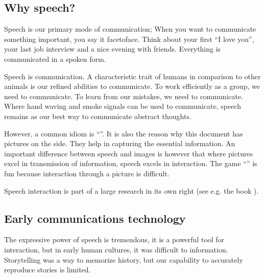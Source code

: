 \documentclass[letterpaper,10pt,english]{jupyterBook}
\begin{document}
\subsection{Why speech?}
\label{\detokenize{Introduction/Why_speech_processing:why-speech}}
\sphinxAtStartPar
Speech is our primary mode of communication; When you want to
communicate something important, you say it face\sphinxhyphen{}to\sphinxhyphen{}face. Think about
your first “I love you”, your last job interview and a nice evening with
friends. Everything  is communicated in a spoken form.

\sphinxAtStartPar
Speech is  communication. A characteristic trait of humans in
comparison to other animals is our refined abilities to communicate. To
work efficiently as a group, we need to communicate. To learn from our
mistakes, we need to communicate. Where hand waving and smoke signals
can be used to communicate, speech remains as our best way to
communicate abstract thoughts.

\sphinxAtStartPar
However, a common idiom is “”. It
is also the reason why this document has pictures on the side. They help
in capturing the essential information. An important difference between
speech and images is however that where pictures excel in transmission
of information, speech excels in interaction. The game
“” is fun because
interaction through a picture is difficult.

\sphinxAtStartPar
Speech interaction is part of a large research in its own right (see
e.g. the book ).

\sphinxAtStartPar
{}


\subsection{Early communications technology}
\label{\detokenize{Introduction/Why_speech_processing:early-communications-technology}}
\sphinxAtStartPar
The expressive power of speech is tremendous, it is a powerful tool for
interaction, but in early human cultures, it was difficult to 
information. Story\sphinxhyphen{}telling was a way to memorize history, but our
capability to accurately reproduce stories is limited.
\end{document}

